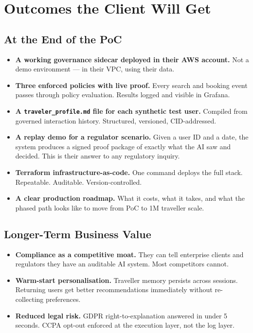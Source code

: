 \documentclass[11pt, a4paper]{article}
\begin{document}
\newpage
\section{Outcomes the Client Will Get}

\subsection{At the End of the PoC}

\begin{itemize}
  \item \textbf{A working governance sidecar deployed in their AWS account.} Not a demo environment --- in their VPC, using their data.

  \item \textbf{Three enforced policies with live proof.} Every search and booking event passes through policy evaluation. Results logged and visible in Grafana.

  \item \textbf{A \texttt{traveler\_profile.md} file for each synthetic test user.} Compiled from governed interaction history. Structured, versioned, CID-addressed.

  \item \textbf{A replay demo for a regulator scenario.} Given a user ID and a date, the system produces a signed proof package of exactly what the AI saw and decided. This is their answer to any regulatory inquiry.

  \item \textbf{Terraform infrastructure-as-code.} One command deploys the full stack. Repeatable. Auditable. Version-controlled.

  \item \textbf{A clear production roadmap.} What it costs, what it takes, and what the phased path looks like to move from PoC to 1M traveller scale.
\end{itemize}

\subsection{Longer-Term Business Value}

\begin{itemize}
  \item \textbf{Compliance as a competitive moat.} They can tell enterprise clients and regulators they have an auditable AI system. Most competitors cannot.

  \item \textbf{Warm-start personalisation.} Traveller memory persists across sessions. Returning users get better recommendations immediately without re-collecting preferences.

  \item \textbf{Reduced legal risk.} GDPR right-to-explanation answered in under 5 seconds. CCPA opt-out enforced at the execution layer, not the log layer.
\end{itemize}
\end{document}
